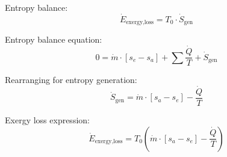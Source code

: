 Entropy balance:  
\[
\dot{E}_{\text{exergy,loss}} = T_0 \cdot \dot{S}_{\text{gen}}
\]  

Entropy balance equation:  
\[
0 = \dot{m} \cdot [s_e - s_a] + \sum \frac{\dot{Q}}{T} + \dot{S}_{\text{gen}}
\]  

Rearranging for entropy generation:  
\[
\dot{S}_{\text{gen}} = \dot{m} \cdot [s_a - s_e] - \frac{\dot{Q}}{T}
\]  

Exergy loss expression:  
\[
\dot{E}_{\text{exergy,loss}} = T_0 \left( \dot{m} \cdot [s_a - s_e] - \frac{\dot{Q}}{T} \right)
\]